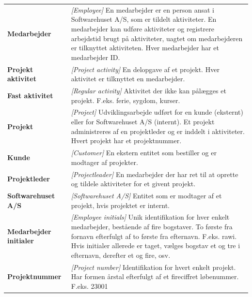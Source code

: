 \begin{table}[H]
    \centering
    \setlength{\extrarowheight}{4pt}
    \begin{tabular}{>{\bfseries}l p{}}
        Medarbejder & \textit{[Employee]} En medarbejder er en person ansat i Softwarehuset A/S, som er tildelt aktiviteter. En medarbejder kan udføre aktiviteter og registrere arbejdstid brugt på aktiviteter, uagtet om medarbejderen er tilknyttet aktiviteten. Hver medarbejder har et medarbejder ID. \\
        
        Projekt aktivitet & \textit{[Project activity]} En delopgave af et projekt. Hver aktivitet er tilknyttet en medarbejder. \\
        
        Fast aktivitet & \textit{[Regular activity]} Aktivitet der ikke kan pålægges et projekt. F.eks. ferie, sygdom, kurser. \\
        
        Projekt & \textit{[Project]} Udviklingsarbejde udført for en kunde (eksternt) eller for Softwarehuset A/S (internt). Et projekt administreres af en projektleder og er inddelt i aktiviteter. Hvert projekt har et projektnummer. \\
        
        Kunde & \textit{[Customer]} En ekstern entitet som bestiller og er modtager af projekter. \\
        
        Projektleder & \textit{[Projectleader]} En medarbejder der har ret til at oprette og tildele aktiviteter for et givent projekt. \\
        
        Softwarehuset A/S & \textit{[Softwarehuset A/S]} Entitet som er modtager af et projekt, hvis projektet er internt. \\
        
        Medarbejder initialer & \textit{[Employee initials]} Unik identifikation for hver enkelt medarbejder, bestående af fire bogstaver. To første fra fornavn efterfulgt af to første fra efternavn. F.eks. rawi. Hvis initialer allerede er taget, vælges bogstav et og tre i efternavn, derefter et og fire, osv. \\
        
        Projektnummer & \textit{[Project number]} Identifikation for hvert enkelt projekt. Har formen årstal efterfulgt af et fireciffret løbenummer. F.eks. 23001 \\
        

\end{tabular}
\end{table}
